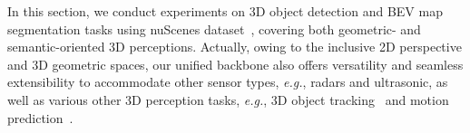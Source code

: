 \documentclass[10pt,twocolumn,letterpaper]{article}
\begin{document}
\begin{table}[t]
\centering
{}
\vspace{-4pt}
\caption{Effect of camera image space fusion, 3D lidar geometric space fusion and BEV unifier on nuScenes (val). 1 row is the lidar-only variant of our model. Camera~(C), LiDAR~(L).}
\label{tab:fuse}
\vspace{-6pt}
\end{table}
\begin{table}[h]
\centering
{}
\vspace{-0pt}
\caption{Effect of parallel intra-modal transformer block.}
\label{tab:singlemodal}
\vspace{-16pt}
\end{table}
In this section, we conduct experiments on 3D object detection and BEV map segmentation tasks using nuScenes dataset~\cite{caesar2020nuscenes}, covering both geometric- and semantic-oriented 3D perceptions. Actually, owing to the inclusive 2D perspective and 3D geometric spaces, our unified backbone also offers versatility and seamless extensibility to accommodate other sensor types, \textit{e.g.}, radars and ultrasonic, as well as various other 3D perception tasks, \emph{e.g.}, 3D object tracking~\cite{yin2021cvpr} and motion prediction~\cite{ettinger2021large}.
\end{document}
